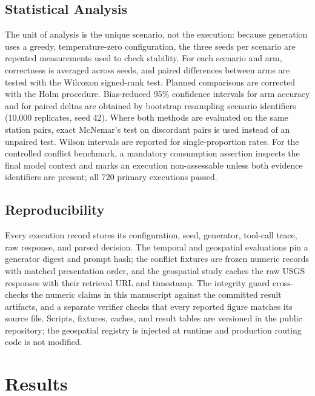 \documentclass[conference]{IEEEtran}
\begin{document}
\subsection{Statistical Analysis}
The unit of analysis is the unique scenario, not the execution: because generation uses a greedy, temperature-zero configuration, the three seeds per scenario are repeated measurements used to check stability. For each scenario and arm, correctness is averaged across seeds, and paired differences between arms are tested with the Wilcoxon signed-rank test. Planned comparisons are corrected with the Holm procedure. Bias-reduced 95\% confidence intervals for arm accuracy and for paired deltas are obtained by bootstrap resampling scenario identifiers (10,000 replicates, seed 42). Where both methods are evaluated on the same station pairs, exact McNemar's test on discordant pairs is used instead of an unpaired test. Wilson intervals are reported for single-proportion rates. For the controlled conflict benchmark, a mandatory consumption assertion inspects the final model context and marks an execution non-assessable unless both evidence identifiers are present; all 720 primary executions passed.

\subsection{Reproducibility}
Every execution record stores its configuration, seed, generator, tool-call trace, raw response, and parsed decision. The temporal and geospatial evaluations pin a generator digest and prompt hash; the conflict fixtures are frozen numeric records with matched presentation order, and the geospatial study caches the raw USGS responses with their retrieval URL and timestamp. The integrity guard cross-checks the numeric claims in this manuscript against the committed result artifacts, and a separate verifier checks that every reported figure matches its source file. Scripts, fixtures, caches, and result tables are versioned in the public repository; the geospatial registry is injected at runtime and production routing code is not modified.

\section{Results}
\end{document}
